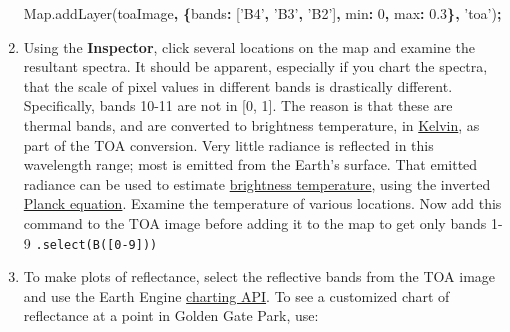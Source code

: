 \documentclass[
]{article}
\newenvironment{Shaded}{\begin{snugshade}}{\end{snugshade}}
\newcommand{\AttributeTok}[1]{\textcolor[rgb]{0.77,0.63,0.00}{#1}}
\newcommand{\DataTypeTok}[1]{\textcolor[rgb]{0.13,0.29,0.53}{#1}}
\newcommand{\DecValTok}[1]{\textcolor[rgb]{0.00,0.00,0.81}{#1}}
\newcommand{\FloatTok}[1]{\textcolor[rgb]{0.00,0.00,0.81}{#1}}
\newcommand{\NormalTok}[1]{#1}
\newcommand{\OperatorTok}[1]{\textcolor[rgb]{0.81,0.36,0.00}{\textbf{#1}}}
\newcommand{\StringTok}[1]{\textcolor[rgb]{0.31,0.60,0.02}{#1}}
\newcommand{\VariableTok}[1]{\textcolor[rgb]{0.00,0.00,0.00}{#1}}
\begin{document}
\begin{enumerate}
\begin{Shaded}
\begin{Highlighting}[]
\VariableTok{Map}\NormalTok{.}\AttributeTok{addLayer}\NormalTok{(toaImage}\OperatorTok{,} \OperatorTok{\{}\DataTypeTok{bands}\OperatorTok{:}\NormalTok{ [}\StringTok{'B4'}\OperatorTok{,} \StringTok{'B3'}\OperatorTok{,} \StringTok{'B2'}\NormalTok{]}\OperatorTok{,} \DataTypeTok{min}\OperatorTok{:} \DecValTok{0}\OperatorTok{,} \DataTypeTok{max}\OperatorTok{:} \FloatTok{0.3}\OperatorTok{\},}  \StringTok{'toa'}\NormalTok{)}\OperatorTok{;}  
\end{Highlighting}
\end{Shaded}
\item
  Using the \textbf{Inspector}, click several locations on the map and examine the resultant spectra. It should be apparent, especially if you chart the spectra, that the scale of pixel values in different bands is drastically different. Specifically, bands 10-11 are not in {[}0, 1{]}. The reason is that these are thermal bands, and are converted to brightness temperature, in \href{https://en.wikipedia.org/wiki/Kelvin}{Kelvin}, as part of the TOA conversion. Very little radiance is reflected in this wavelength range; most is emitted from the Earth's surface. That emitted radiance can be used to estimate \href{https://en.wikipedia.org/wiki/Brightness_temperature}{brightness temperature}, using the inverted \href{https://en.wikipedia.org/wiki/Planck's_law}{Planck equation}. Examine the temperature of various locations. Now add this command to the TOA image before adding it to the map to get only bands 1-9 \texttt{.select(\textquotesingle{}B({[}0-9{]})\textquotesingle{})}
\item
  To make plots of reflectance, select the reflective bands from the TOA image and use the Earth Engine \href{https://developers.google.com/earth-engine/charts}{charting API}. To see a customized chart of reflectance at a point in Golden Gate Park, use:


\end{enumerate}
\end{document}
